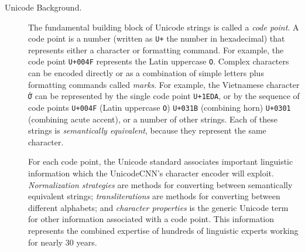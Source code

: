 \documentclass[sigconf,anonymous,review]{acmart}
\newcommand{\str}[1]{\texttt{#1}}
\newcommand{\defn}[1]{\textit{#1}}
\begin{document}
\begin{description}


\item[Unicode Background.]
The fundamental building block of Unicode strings is called a \defn{code point}.
A code point is a number (written as \str{U+} the number in hexadecimal)
that represents either a character or formatting command.
For example, the code point \str{U+004F} represents the Latin uppercase \str{O}.
Complex characters can be encoded directly or as a combination of simple letters plus formatting commands called \defn{marks}.
For example, the Vietnamese character \str{\foreignlanguage{vietnamese}{Ớ}} can be represented by the single code point \str{U+1EDA},
or by the sequence of code points \str{U+004F} (Latin uppercase \str{O}) \str{U+031B} (combining horn) \str{U+0301} (combining acute accent),
or a number of other strings.
Each of these strings is \defn{semantically equivalent},
because they represent the same character.

For each code point, the Unicode standard \citep{Unicode} associates important linguistic information which the UnicodeCNN's character encoder will exploit.
\defn{Normalization strategies} are methods for converting between semantically equivalent strings;
\defn{transliterations} are methods for converting between different alphabets;
and \defn{character properties} is the generic Unicode term for other information associated with a code point. 
This information represents the combined expertise of hundreds of linguistic experts working for nearly 30 years.



\end{description}
\end{document}
